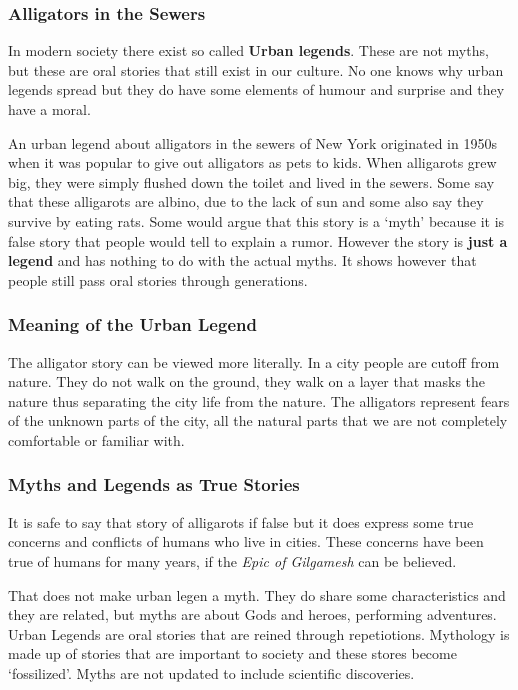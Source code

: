 \documentclass{article}
\begin{document}
\subsubsection{Alligators in the Sewers}

In modern society there exist so called \textbf{Urban legends}. These are not myths, but these are oral stories that still exist in our culture. No one knows why urban legends spread but they do have some elements of humour and surprise and they have a moral.

An urban legend about alligators in the sewers of New York originated in 1950s when it was popular to give out alligators as pets to kids. When alligarots grew big, they were simply flushed down the toilet and lived in the sewers. Some say that these alligarots are albino, due to the lack of sun and some also say they survive by eating rats. Some would argue that this story is a `myth' because it is false story that people would tell to explain a rumor. However the story is \textbf{just a legend} and has nothing to do with the actual myths. It shows however that people still pass oral stories through generations.

\subsubsection{Meaning of the Urban Legend}

The alligator story can be viewed more literally. In a city people are cutoff from nature. They do not walk on the ground, they walk on a layer that masks the nature thus separating the city life from the nature. The alligators represent fears of the unknown parts of the city, all the natural parts that we are not completely comfortable or familiar with.

\subsubsection{Myths and Legends as True Stories}

It is safe to say that story of alligarots if false but it does express some true concerns and conflicts of humans who live in cities. These concerns have been true of humans for many years, if the \textit{Epic of Gilgamesh} can be believed.

That does not make urban legen a myth. They do share some characteristics and they are related, but myths are about Gods and heroes, performing adventures. Urban Legends are oral stories that are reined through repetiotions. Mythology is made up of stories that are important to society and these stores become `fossilized'. Myths are not updated to include scientific discoveries.
\end{document}

